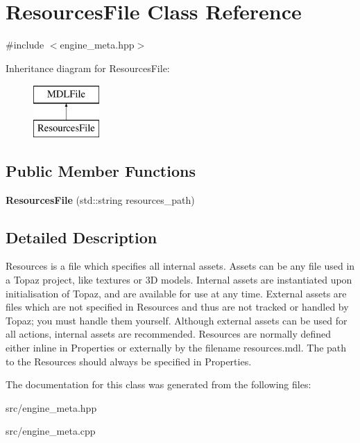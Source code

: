 \hypertarget{class_resources_file}{}\section{Resources\+File Class Reference}
\label{class_resources_file}


{\ttfamily \#include $<$engine\+\_\+meta.\+hpp$>$}

Inheritance diagram for Resources\+File\+:\begin{figure}[H]
\begin{center}
\leavevmode
\includegraphics[height=2.000000cm]{class_resources_file}
\end{center}
\end{figure}
\subsection*{Public Member Functions}
\begin{DoxyCompactItemize}
\item 
\mbox{\label{class_resources_file_af54641444509becb743c53c807229ccb}} 
{\bfseries Resources\+File} (std\+::string resources\+\_\+path)
\end{DoxyCompactItemize}


\subsection{Detailed Description}
Resources is a file which specifies all internal assets. Assets can be any file used in a Topaz project, like textures or 3D models. Internal assets are instantiated upon initialisation of Topaz, and are available for use at any time. External assets are files which are not specified in Resources and thus are not tracked or handled by Topaz; you must handle them yourself. Although external assets can be used for all actions, internal assets are recommended. Resources are normally defined either inline in Properties or externally by the filename \textquotesingle{}resources.\+mdl\textquotesingle{}. The path to the Resources should always be specified in Properties. 

The documentation for this class was generated from the following files\+:\begin{DoxyCompactItemize}
\item 
src/engine\+\_\+meta.\+hpp\item 
src/engine\+\_\+meta.\+cpp\end{DoxyCompactItemize}

